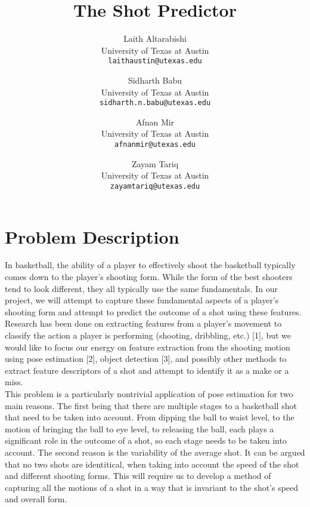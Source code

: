 \documentclass[10pt,twocolumn,letterpaper]{article}
\begin{document}
\title{The Shot Predictor}

\author{Laith Altarabishi\\
University of Texas at Austin\\
{\tt\small laithaustin@utexas.edu}
\and
Sidharth Babu\\
University of Texas at Austin\\
{\tt\small sidharth.n.babu@utexas.edu}
\and
Afnan Mir \\
University of Texas at Austin\\
{\tt\small afnanmir@utexas.edu}
\and
Zayam Tariq \\
University of Texas at Austin\\
{\tt\small zayamtariq@utexas.edu}
}
\maketitle


\section{Problem Description}
\label{sec:intro}

In basketball, the ability of a player to effectively shoot the basketball typically comes down to the player’s shooting form. While the form of the best shooters tend to look different, they all typically use the same fundamentals. In our project, we will attempt to capture these fundamental aspects of a player’s shooting form and attempt to predict the outcome of a shot using these features. Research has been done on extracting features from a player’s movement to classify the action a player is performing (shooting, dribbling, etc.) [1], but we would like to focus our energy on feature extraction from the shooting motion using pose estimation [2], object detection [3], and possibly other methods to extract feature descriptors of a shot and attempt to identify it as a make or a miss.\\
\indent This problem is a particularly nontrivial application of pose estimation for two main reasons. The first being that there are multiple stages to
a basketball shot that need to be taken into account. From dipping the ball to waist level, to the motion of bringing the ball to eye level, to releasing the ball, each
plays a significant role in the outcome of a shot, so each stage needs to be taken into account. The second reason is the variability of the average shot. It can be argued that no two shots are identitical, when taking into account the speed of the shot
and different shooting forms. This will require us to develop a method of capturing all the motions of a shot in a way that is invariant to the shot's speed and overall form.
\end{document}
